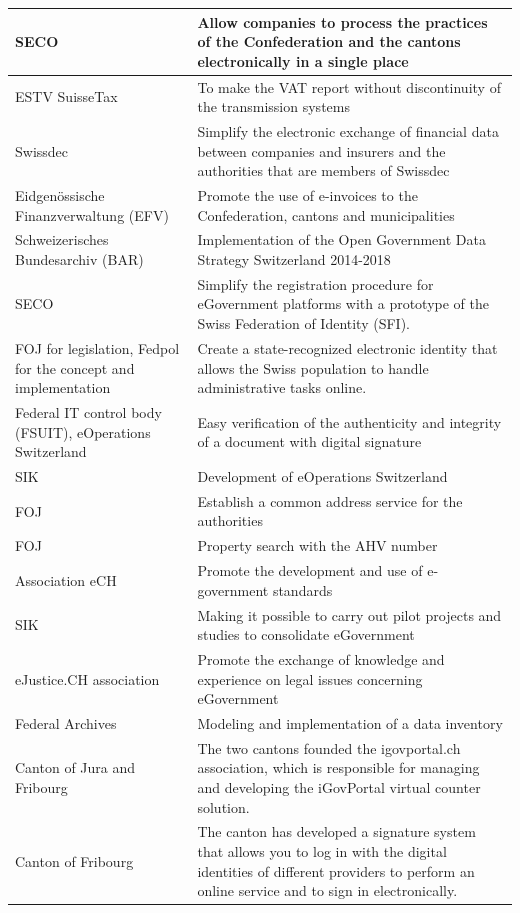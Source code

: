 \begin{longtable}[ c ]{| m{4.5cm} | m{9cm}|}
 SECO & Allow companies to process the practices of the Confederation and the cantons electronically in a single place\\ \hline
 ESTV SuisseTax & To make the VAT report without discontinuity of the transmission systems \\ \hline
 Swissdec & Simplify the electronic exchange of financial data between companies and insurers and the authorities that are members of Swissdec\\ \hline
 Eidgenössische Finanzverwaltung (EFV) & Promote the use of e-invoices to the Confederation, cantons and municipalities\\ \hline
 Schweizerisches Bundesarchiv (BAR) & Implementation of the Open Government Data Strategy Switzerland 2014-2018\\ \hline
 SECO & Simplify the registration procedure for eGovernment platforms with a prototype of the Swiss Federation of Identity (SFI).\\ \hline
 FOJ for legislation, Fedpol for the concept and implementation & Create a state-recognized electronic identity that allows the Swiss population to handle administrative tasks online.\\ \hline
 Federal IT control body (FSUIT), eOperations Switzerland & Easy verification of the authenticity and integrity of a document with digital signature\\ \hline
 SIK & Development of eOperations Switzerland\\ \hline
 FOJ & Establish a common address service for the authorities\\ \hline
 FOJ & Property search with the AHV number\\ \hline
 Association eCH & Promote the development and use of e-government standards\\ \hline
 SIK & Making it possible to carry out pilot projects and studies to consolidate eGovernment\\ \hline
 eJustice.CH association & Promote the exchange of knowledge and experience on legal issues concerning eGovernment\\ \hline
 Federal Archives & Modeling and implementation of a data inventory\\ \hline
 Canton of Jura and Fribourg & The two cantons founded the igovportal.ch association, which is responsible for managing and developing the iGovPortal virtual counter solution.\\ \hline
 Canton of Fribourg & The canton has developed a signature system that allows you to log in with the digital identities of different providers to perform an online service and to sign in electronically.\\ \hline

\end{longtable}
